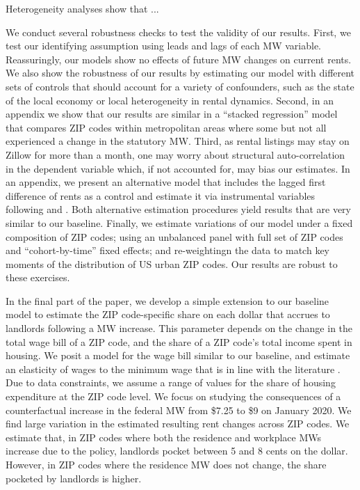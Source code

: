 Heterogeneity analyses show that ...


We conduct several robustness checks to test the validity of our results.
First, we test our identifying assumption using leads and lags of each MW variable.
Reassuringly, our models show no effects of future MW changes on current rents.
We also show the robustness of our results by estimating our model with different 
sets of controls that should account for a variety of confounders, such as the state
of the local economy or local heterogeneity in rental dynamics.
Second, in an appendix we show that our results are similar in a ``stacked regression'' 
model that compares ZIP codes within metropolitan areas where some but not all
experienced a change in the statutory MW.
Third, as rental listings may stay on Zillow for more than a month, one may worry 
about structural auto-correlation in the dependent variable which, if not accounted 
for, may bias our estimates.
In an appendix, we present an alternative model that includes the lagged first 
difference of rents as a control and estimate it via instrumental variables
following \textcite{ArellanoBond1991} and \textcite{MeerWest2016}.
Both alternative estimation procedures yield results that are very similar to our 
baseline.
Finally, we estimate variations of our model under a fixed composition of ZIP codes;
using an unbalanced panel with full set of ZIP codes and ``cohort-by-time'' fixed 
effects; and re-weightingn the data to match key moments of the distribution of 
US urban ZIP codes.
Our results are robust to these exercises.


In the final part of the paper, we develop a simple extension to our baseline model
to estimate the ZIP code-specific share on each dollar that accrues to landlords
following a MW increase.
This parameter depends on the change in the total wage bill of a ZIP code, and the 
share of a ZIP code's total income spent in housing.
We posit a model for the wage bill similar to our baseline, and estimate an 
elasticity of wages to the minimum wage that is in line with the literature
\parencite[e.g.,][]{CegnizEtAl2019}.
Due to data constraints, we assume a range of values for the share of housing
expenditure at the ZIP code level.
We focus on studying the consequences of a counterfactual increase in the federal 
MW from \$7.25 to \$9 on January 2020.
We find large variation in the estimated resulting rent changes across ZIP codes.
We estimate that, in ZIP codes where both the residence and workplace MWs increase
due to the policy, landlords pocket between 5 and 8 cents on the dollar.
However, in ZIP codes where the residence MW does not change, the share pocketed
by landlords is higher.

